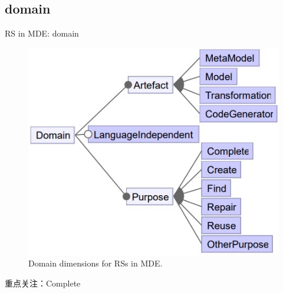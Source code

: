 \documentclass{beamer}
\begin{document}
\subsection{domain}
\begin{frame}{RS in MDE: domain}
    \begin{figure}
        \centering
        \includegraphics[width = 0.6\linewidth]{RS4MDE-pic/domain.jpg}
        \caption{Domain dimensions for RSs in MDE.}
    \end{figure}
    重点关注：Complete
\end{frame}
\end{document}
